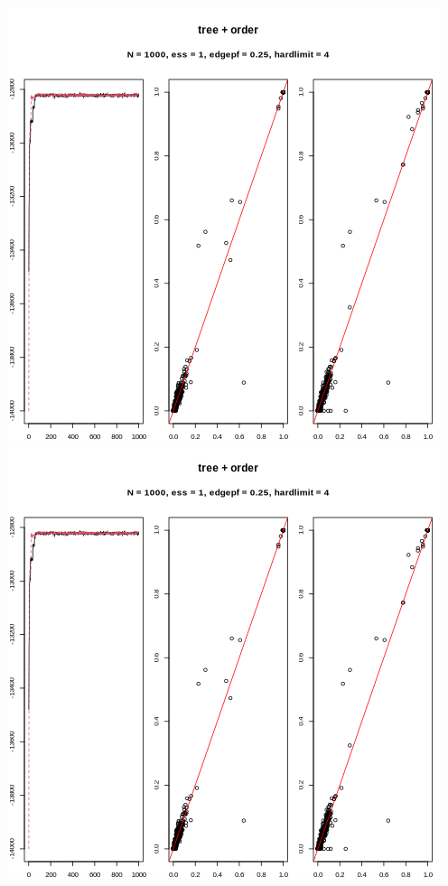 \documentclass[
]{article}
\begin{document}
\includegraphics{edgeps_child_tree_order.png}
\includegraphics{edgeps_child_tree_order.png}
\end{document}
